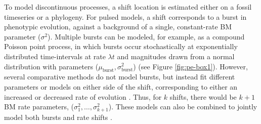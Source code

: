 	To model discontinuous processes, a shift location is estimated either on a fossil timeseries or a phylogeny. For pulsed models, a shift corresponds to a burst in phenotypic evolution, against a background of a single, constant-rate BM parameter ($\sigma^2$). Multiple bursts can be modeled, for example, as a compound Poisson point process, in which bursts occur stochastically at exponentially distributed time-intervals at rate $\lambda t$ and magnitudes drawn from a normal distribution with parameters ($\mu_{\text{burst}},  \sigma^2_{\text{burst}}$) (see Figure \ref{fig:pe-box1}). However, several comparative methods do not model bursts, but instead fit different parameters or models on either side of the shift, corresponding to either an increased or decreased rate of evolution \citep{Omeara2006, Hunt2008, Eastman2011}. Thus, for $k$ shifts, there would be $k+\text{1}$ BM rate parameters, (${\sigma^2_{\text{1}},\ldots,\sigma^2_{k+\text{1}}}$). These models can also be combined to jointly model both bursts and rate shifts \citep{Eastmanjump}.

